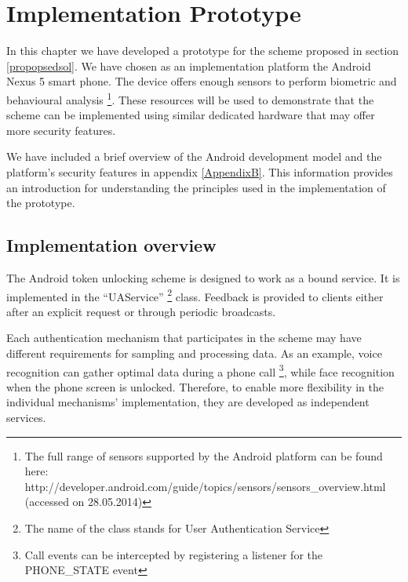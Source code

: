 
\chapter{Implementation Prototype} %

\label{Chapter4} %

In this chapter we have developed a prototype for the scheme proposed in section \ref{propopsedsol}. We have chosen as an implementation platform the Android Nexus 5 smart phone. The device offers enough sensors to perform biometric and behavioural analysis \footnote{The full range of sensors supported by the Android platform can be found here: http://developer.android.com/guide/topics/sensors/sensors\_overview.html (accessed on 28.05.2014)}. These resources will be used to demonstrate that the scheme can be implemented using similar dedicated hardware that may offer more security features.

We have included a brief overview of the Android development model and the platform's security features in appendix \ref{AppendixB}. This information provides an introduction for understanding the principles used in the implementation of the prototype.

\section{Implementation overview}
\label{impleoverview}
The Android token unlocking scheme is designed to work as a bound service. It is implemented in the ``UAService'' \footnote{The name of the class stands for User Authentication Service} class. Feedback is provided to clients either after an explicit request or through periodic broadcasts.

Each authentication mechanism that participates in the scheme may have different requirements for sampling and processing data. As an example, voice recognition can gather optimal data during a phone call \footnote{Call events can be intercepted by registering a listener for the PHONE\_STATE event}, while face recognition when the phone screen is unlocked. Therefore, to enable more flexibility in the individual mechanisms' implementation, they are developed as independent services.

